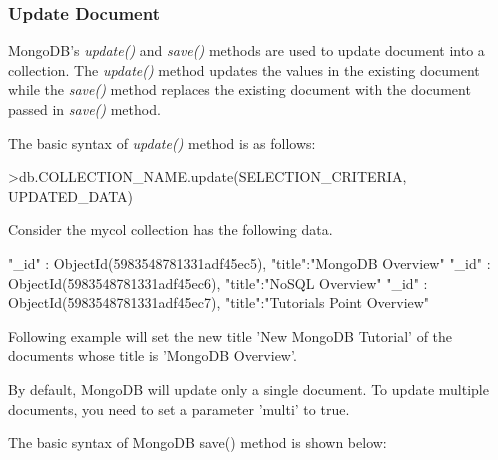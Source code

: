 \documentclass[12pt]{article}
\begin{document}
\subsubsection{Update Document}

MongoDB's \emph{update()} and \emph{save()} methods are used to update
document into a collection. The \emph{update()} method updates the
values in the existing document while the \emph{save()} method replaces
the existing document with the document passed in \emph{save()} method.

The basic syntax of \emph{update()} method is as follows:

\begin{bashcode}
>db.COLLECTION_NAME.update(SELECTION_CRITERIA, UPDATED_DATA)
\end{bashcode}
Consider the mycol collection has the following data.

\begin{javascriptcode}
{ "_id" : ObjectId(5983548781331adf45ec5), "title":"MongoDB Overview"}
{ "_id" : ObjectId(5983548781331adf45ec6), "title":"NoSQL Overview"}
{ "_id" : ObjectId(5983548781331adf45ec7), "title":"Tutorials Point Overview"}
\end{javascriptcode}

Following example will set the new title 'New MongoDB Tutorial' of the
documents whose title is 'MongoDB Overview'.


By default, MongoDB will update only a single document. To update
multiple documents, you need to set a parameter 'multi' to true.


The basic syntax of MongoDB save() method is shown below:
\end{document}
